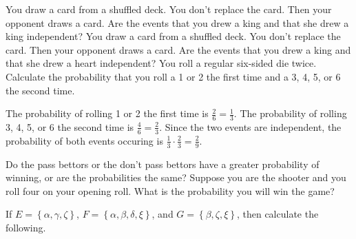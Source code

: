 \documentclass[answers,12pt]{exam}
\begin{document}
\begin{questions}
\question You draw a card from a shuffled deck. You don't replace
the card. Then your opponent draws a card. Are the events that
you drew a king and that she drew a king independent?
\question You draw a card from a shuffled deck. You don't replace
the card. Then your opponent draws a card. Are the events that
you drew a king and that she drew a heart independent?
\question You roll a regular six-sided die twice. Calculate
the probability that you roll a 1 or 2 the first time and a
3, 4, 5, or 6 the second time.
\begin{solution} The probability of rolling 1 or 2 the first
time is $\frac{2}{6}=\frac{1}{3}$.
The probability of rolling 3, 4, 5, or 6 the second time
is $\frac{4}{6}=\frac{2}{3}$.
Since the two events are independent, the probability of both
events occuring is $\frac{1}{3}\cdot\frac{2}{3}=\frac{2}{9}$. \end{solution}

\question Do the pass bettors or the don't pass bettors have
a greater probability of winning, or are the probabilities the same?
\question Suppose you are the shooter and you roll four on your opening
roll. What is the probability you will win the game?

\question If $E=\left\{\alpha,\gamma,\zeta\right\}$,
$F=\left\{\alpha,\beta,\delta,\xi\right\}$, and
$G=\left\{\beta,\zeta,\xi\right\}$, then calculate the following.
\end{questions}
\end{document}
